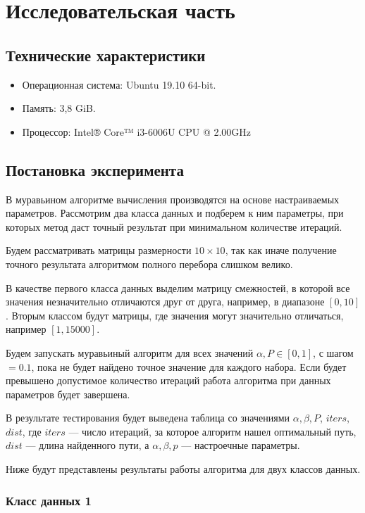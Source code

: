 \chapter{Исследовательская часть}

\section{Технические характеристики}

\begin{itemize}
	\item Операционная система: Ubuntu 19.10 64-bit.
	\item Память: 3,8 GiB.
	\item Процессор: Intel® Core™ i3-6006U CPU @ 2.00GHz
\end{itemize}

\section{Постановка эксперимента}

В муравьином алгоритме вычисления производятся на основе настраиваемых параметров.
Рассмотрим два класса данных и подберем к ним параметры, при которых метод даст точный результат при минимальном количестве итераций.

Будем рассматривать матрицы размерности $10\times10$, так как иначе получение точного результата алгоритмом полного перебора слишком велико.

В качестве первого класса данных выделим матрицу смежностей, в которой все значения незначительно отличаются друг от друга, например, в диапазоне $[0, 10]$.
Вторым классом будут матрицы, где значения могут значительно отличаться, например $[1, 15000]$.

Будем запускать муравьиный алгоритм для всех значений $\alpha, P\in[0, 1]$, с шагом $= 0.1$, пока не будет найдено точное значение для каждого набора.
Если будет превышено допустимое количество итераций работа алгоритма при данных параметров будет завершена.

В результате тестирования будет выведена таблица со значениями $\alpha, \beta, P$, $iters$, $ dist$, где $iters$ — число итераций, за которое алгоритм нашел оптимальный путь, $dist$ — длина найденного пути, а $\alpha, \beta, p$ — настроечные параметры.

Ниже будут представлены результаты работы алгоритма для двух классов данных.

\subsection{Класс данных 1}

